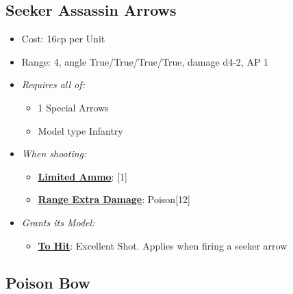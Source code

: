 \documentclass[a4paper,12pt]{article}
\begin{document}
\subsection{Seeker Assassin Arrows}
\label{equipment-seeker-assassin-arrows}

\begin{itemize}
\item Cost: 16cp per Unit
\item Range: 4, angle True/True/True/True, damage d4-2, AP 1
\item \textit{Requires all of:}
\begin{itemize}
\item 1 Special Arrows
\item Model type Infantry
\end{itemize}
\item \textit{When shooting:}
\begin{itemize}
\item \textbf{\hyperref[rule-special-limited-ammo]{Limited Ammo}}: [1]
\item \textbf{\hyperref[rule-special-range-extra-damage]{Range Extra Damage}}: Poison[12]

\end{itemize}





\item \textit{Grants its Model:}
\begin{itemize}
\item \textbf{\hyperref[rule-special-to-hit]{To Hit}}: Excellent Shot. Applies when firing a seeker arrow

\end{itemize}

\end{itemize}

\subsection{Poison Bow}
\label{equipment-poison-bow}
\end{document}
